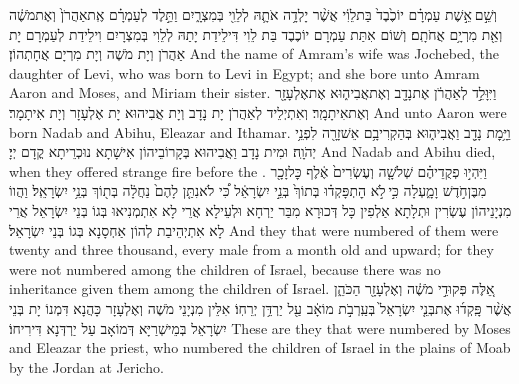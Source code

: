{וְשֵׁ֣ם \legarmeh  אֵ֣שֶׁת עַמְרָ֗ם יוֹכֶ֙בֶד֙ בַּת\maqqaf לֵוִ֔י אֲשֶׁ֨ר יָלְדָ֥ה אֹתָ֛הּ לְלֵוִ֖י בְּמִצְרָ֑יִם וַתֵּ֣לֶד לְעַמְרָ֗ם אֶֽת\maqqaf אַהֲרֹן֙ וְאֶת\maqqaf מֹשֶׁ֔ה וְאֵ֖ת מִרְיָ֥ם אֲחֹתָֽם׃}
{וְשׁוֹם אִתַּת עַמְרָם יוֹכֶבֶד בַּת לֵוִי דִּילֵידַת יָתַהּ לְלֵוִי בְּמִצְרָיִם וִילֵידַת לְעַמְרָם יָת אַהֲרֹן וְיָת מֹשֶׁה וְיָת מִרְיָם אֲחָתְהוֹן׃}
{And the name of Amram’s wife was Jochebed, the daughter of Levi, who was born to Levi in Egypt; and she bore unto Amram Aaron and Moses, and Miriam their sister.}{}
{וַיִּוָּלֵ֣ד לְאַהֲרֹ֔ן אֶת\maqqaf נָדָ֖ב וְאֶת\maqqaf אֲבִיה֑וּא אֶת\maqqaf אֶלְעָזָ֖ר וְאֶת\maqqaf אִיתָמָֽר׃}
{וְאִתְיְלֵיד לְאַהֲרֹן יָת נָדָב וְיָת אֲבִיהוּא יָת אֶלְעָזָר וְיָת אִיתָמָר׃}
{And unto Aaron were born Nadab and Abihu, Eleazar and Ithamar.}{}
{וַיָּ֥מׇת נָדָ֖ב וַאֲבִיה֑וּא בְּהַקְרִיבָ֥ם אֵשׁ\maqqaf זָרָ֖ה לִפְנֵ֥י יְהֹוָֽה׃}
{וּמִית נָדָב וַאֲבִיהוּא בְּקָרוֹבֵיהוֹן אִישָׁתָא נוּכְרֵיתָא קֳדָם יְיָ׃}
{And Nadab and Abihu died, when they offered strange fire before the \lord.}{}
{וַיִּהְי֣וּ פְקֻדֵיהֶ֗ם שְׁלֹשָׁ֤ה וְעֶשְׂרִים֙ אֶ֔לֶף כׇּל\maqqaf זָכָ֖ר מִבֶּן\maqqaf חֹ֣דֶשׁ וָמָ֑עְלָה כִּ֣י \legarmeh  לֹ֣א הׇתְפָּקְד֗וּ בְּתוֹךְ֙ בְּנֵ֣י יִשְׂרָאֵ֔ל כִּ֠י לֹא\maqqaf נִתַּ֤ן לָהֶם֙ נַחֲלָ֔ה בְּת֖וֹךְ בְּנֵ֥י יִשְׂרָאֵֽל׃}
{וַהֲווֹ מִנְיָנֵיהוֹן עֶשְׂרִין וּתְלָתָא אַלְפִין כָּל דְּכוּרָא מִבַּר יַרְחָא וּלְעֵילָא אֲרֵי לָא אִתְמְנִיאוּ בְּגוֹ בְּנֵי יִשְׂרָאֵל אֲרֵי לָא אִתְיְהֵיבַת לְהוֹן אַחְסָנָא בְּגוֹ בְּנֵי יִשְׂרָאֵל׃}
{And they that were numbered of them were twenty and three thousand, every male from a month old and upward; for they were not numbered among the children of Israel, because there was no inheritance given them among the children of Israel.}{}
{אֵ֚לֶּה פְּקוּדֵ֣י מֹשֶׁ֔ה וְאֶלְעָזָ֖ר הַכֹּהֵ֑ן אֲשֶׁ֨ר פָּֽקְד֜וּ אֶת\maqqaf בְּנֵ֤י יִשְׂרָאֵל֙ בְּעַֽרְבֹ֣ת מוֹאָ֔ב עַ֖ל יַרְדֵּ֥ן יְרֵחֽוֹ׃}
{אִלֵּין מִנְיָנֵי מֹשֶׁה וְאֶלְעָזָר כָּהֲנָא דִּמְנוֹ יָת בְּנֵי יִשְׂרָאֵל בְּמֵישְׁרַיָּא דְּמוֹאָב עַל יַרְדְּנָא דִּירִיחוֹ׃}
{These are they that were numbered by Moses and Eleazar the priest, who numbered the children of Israel in the plains of Moab by the Jordan at Jericho.}{}
